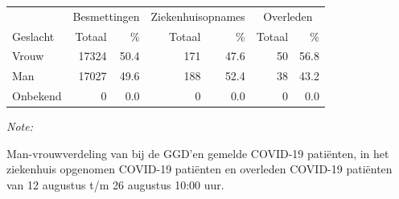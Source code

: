 \documentclass[
  english,
  man,floatsintext]{apa6}
\begin{document}
\begin{table}
\centering\begingroup\fontsize{11}{13}\selectfont

\begin{threeparttable}
\begin{tabular}{lrrrrrr}
\toprule
\multicolumn{1}{c}{ } & \multicolumn{2}{c}{Besmettingen} & \multicolumn{2}{c}{Ziekenhuisopnames} & \multicolumn{2}{c}{Overleden} \\
\cmidrule(l{3pt}r{3pt}){2-3} \cmidrule(l{3pt}r{3pt}){4-5} \cmidrule(l{3pt}r{3pt}){6-7}
Geslacht & Totaal & \% & Totaal & \% & Totaal & \%\\
\midrule
Vrouw & 17324 & 50.4 & 171 & 47.6 & 50 & 56.8\\
Man & 17027 & 49.6 & 188 & 52.4 & 38 & 43.2\\
Onbekend & 0 & 0.0 & 0 & 0.0 & 0 & 0.0\\
\bottomrule
\end{tabular}
\begin{tablenotes}
\item \textit{Note: } 
\item Man-vrouwverdeling van bij de GGD’en gemelde COVID-19 patiënten, in het ziekenhuis opgenomen COVID-19 patiënten en overleden COVID-19 patiënten van 12 augustus t/m 26 augustus 10:00 uur.
\end{tablenotes}
\end{threeparttable}
\endgroup{}
\end{table}
\newpage
\end{document}
